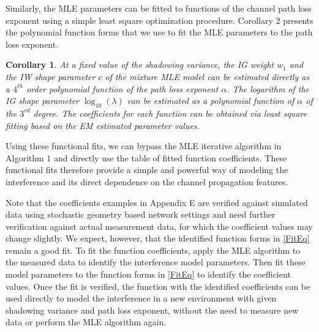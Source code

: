 \documentclass[12pt, draftclsnofoot, onecolumn]{IEEEtran}
\newtheorem{corollary}{Corollary}
\theoremstyle{plain}
\begin{document}
Similarly, the MLE parameters can be fitted to functions of the {\color{black}channel} path loss exponent using a simple least square optimization procedure. Corollary 2 presents the polynomial function forms that we use to fit the MLE parameters to the path loss exponent.
\vspace{-.1in}
%
\begin{corollary}\label{ParameterFitLemma2}
At a fixed value of the shadowing variance, the IG weight $w_1$ and the IW shape parameter $c$ of the mixture MLE model can be estimated directly as a $4^{th}$ order polynomial function of the path loss exponent $\alpha$. 
The logarithm of the IG shape parameter $\log_{10}(\lambda)$ can be estimated as a polynomial function of $\alpha$ of the $3^{rd}$ degree.
%
The coefficients for each function can be
obtained via least square fitting based on the EM estimated parameter values.%
\end{corollary}\vspace{-.1in}

%
Using these functional fits, we can bypass the MLE iterative algorithm in Algorithm 1 and directly use the table of fitted function coefficients. These functional fits therefore provide a simple and powerful way of modeling the interference and its direct dependence on the {\color{black}channel} propagation features.

Note that the coefficients examples in Appendix E are verified against simulated data using stochastic geometry based network settings and need further verification against actual measurement data, for which the coefficient values may change slightly. We expect, however, that the identified function forms in \eqref{FitEq} remain a good fit. To fit the function coefficients, apply the MLE algorithm to the measured data to identify the interference model parameters. Then fit these model parameters to the function forms in \eqref{FitEq} to identify the coefficient values. Once the fit is verified, the function  with the identified coefficients can be used directly to model the interference in a new environment with given shadowing variance and path loss exponent, without the need to measure new data or perform the MLE algorithm again.
%
\iffalse
\end{document}
